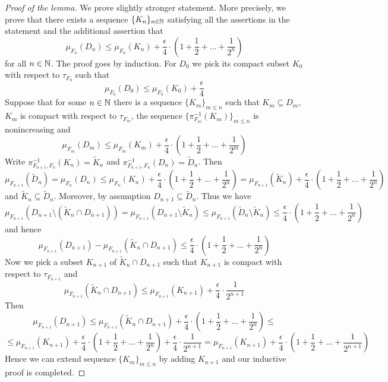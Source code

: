 \begin{proof}[Proof of the lemma]
We prove slightly stronger statement. More precisely, we prove that there exists a sequence $\{K_n\}_{n\in {\mathbb N}}$ satisfying all the assertions in the statement and the additional assertion that
$$\mu_{F_n}(D_n)\leq \mu_{F_n}(K_n) + \frac{\epsilon}{4}\cdot \left(1 + \frac{1}{2} + ... + \frac{1}{2^n}\right)$$
for all $n\in {\mathbb N}$. The proof goes by induction. For $D_0$ we pick its compact subset $K_0$ with respect to $\tau_{F_0}$ such that 
$$\mu_{F_0}(D_0) \leq \mu_{F_0}(K_0) + \frac{\epsilon}{4}$$
Suppose that for some $n\in {\mathbb N}$ there is a sequence $\{K_m\}_{m\leq n}$ such that $K_m\subseteq D_m$, $K_m$ is compact with respect to $\tau_{F_{m}}$, the sequence $\{\pi^{-1}_{F_m}(K_m)\}_{m\leq n}$ is nonincreasing and
$$\mu_{F_m}(D_m)\leq \mu_{F_m}(K_m) + \frac{\epsilon}{4}\cdot \left(1 + \frac{1}{2} + ... + \frac{1}{2^m}\right)$$
Write $\pi_{F_{n+1},F_n}^{-1}(K_n) = \tilde{K}_n$ and $\pi_{F_{n+1},F_n}^{-1}(D_n) = \tilde{D}_n$. Then
$$\mu_{F_{n+1}}(\tilde{D}_n) = \mu_{F_n}(D_n) \leq \mu_{F_n}(K_n) + \frac{\epsilon}{4}\cdot \left(1 + \frac{1}{2} + ... + \frac{1}{2^n}\right) = \mu_{F_{n+1}}(\tilde{K}_n) + \frac{\epsilon}{4}\cdot \left(1 + \frac{1}{2} + ... + \frac{1}{2^n}\right)$$
and $\tilde{K}_n \subseteq \tilde{D}_n$. Moreover, by assumption $D_{n+1}\subseteq \tilde{D}_n$. Thus we have
$$\mu_{F_{n+1}}\left(D_{n+1} \setminus (\tilde{K}_{n}\cap D_{n+1})\right) = \mu_{F_{n+1}}(D_{n+1} \setminus \tilde{K}_{n}) \leq \mu_{F_{n+1}}(\tilde{D}_{n} \setminus \tilde{K}_{n}) \leq \frac{\epsilon}{4}\cdot \left(1 + \frac{1}{2} + ... + \frac{1}{2^n}\right)$$
and hence
$$\mu_{F_{n+1}}\left(D_{n+1}\right) - \mu_{F_{n+1}}\left(\tilde{K}_{n}\cap D_{n+1}\right) \leq \frac{\epsilon}{4}\cdot \left(1 + \frac{1}{2} + ... + \frac{1}{2^n}\right)$$
Now we pick a subset $K_{n+1}$ of $\tilde{K}_{n}\cap D_{n+1}$ such that $K_{n+1}$ is compact with respect to $\tau_{F_{n+1}}$ and 
$$\mu_{F_{n+1}}(\tilde{K}_{n}\cap D_{n+1}) \leq \mu_{F_{n+1}}(K_{n+1}) + \frac{\epsilon}{4}\cdot \frac{1}{2^{n+1}}$$
Then
$$\mu_{F_{n+1}}\left(D_{n+1}\right) \leq \mu_{F_{n+1}}\left(\tilde{K}_{n}\cap D_{n+1}\right) + \frac{\epsilon}{4}\cdot \left(1 + \frac{1}{2} + ... + \frac{1}{2^n}\right) \leq $$
$$\leq \mu_{F_{n+1}}(K_{n+1}) + \frac{\epsilon}{4}\cdot \left(1 + \frac{1}{2} + ... + \frac{1}{2^n}\right) + \frac{\epsilon}{4}\cdot \frac{1}{2^{n+1}} = \mu_{F_{n+1}}(K_{n+1}) + \frac{\epsilon}{4}\cdot \left(1 + \frac{1}{2} + ... + \frac{1}{2^{n+1}}\right)$$
Hence we can extend sequence $\{K_m\}_{m\leq n}$ by adding $K_{n+1}$ and our inductive proof is completed.
\end{proof}

